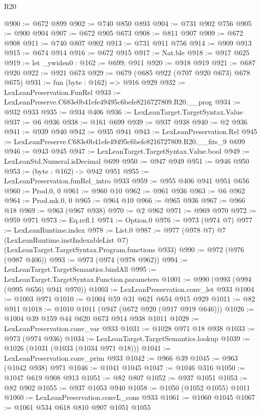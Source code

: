 \begin{lexlean}{R20}
\begin{coremodule}
@900 := @672 @899
@902 := @740 @850 @893
@904 := @731 @902 @756
@905 := @900 @904
@907 := @672 @905 @673
@908 := @811 @907
@909 := @672 @908
@911 := @740 @807 @902
@913 := @731 @911 @756
@914 := @909 @913
@915 := @674 @914
@916 := @672 @915
@917 := Nat.ble
@918 := @917 @625
@919 := let _ywiden0 : @162 := @699; @911
@920 := @918 @919
@921 := @687 @920
@922 := @921 @673
@929 := @679 (@685 @922 (@707 @920 @673) @678 @675)
@931 := fun (byte : @162) => @916 @929
@932 := LexLeanPreservation.FunRel
@933 := LexLeanPreserve.C683e0b41efe49495c6befe8216727809.R20.__prog
@934 := @932 @933
@935 := @934 @406
@936 := LexLeanTarget.TargetSyntax.Value
@937 := @6 @936
@938 := @161 @699
@939 := @937 @938
@940 := @2 @936
@941 := @939 @940
@942 := @935 @941
@943 := LexLeanPreservation.Rel
@945 := LexLeanPreserve.C683e0b41efe49495c6befe8216727809.R20.__fits_9 @699
@946 := @943 @945
@947 := LexLeanTarget.TargetSyntax.Value.bool
@949 := LexLeanStd.Numeral.isDecimal @699
@950 := @947 @949
@951 := @946 @950
@953 := (byte : @162) -> @942 @951
@955 := LexLeanPreservation.funRel_intro @933
@959 := @955 @406 @941 @951 @656
@960 := Prod.{0, 0}
@961 := @960 @10
@962 := @961 @936
@963 := @6 @962
@964 := Prod.mk.{0, 0}
@965 := @964 @10
@966 := @965 @936
@967 := @966 @18
@969 := @963 (@967 @938)
@970 := @2 @962
@971 := @969 @970
@972 := @959 @971
@973 := Eq.refl.{1}
@974 := Option.{0}
@976 := @973 (@974 @7)
@977 := LexLeanRuntime.index
@978 := List.{0}
@987 := @977
    (@978 @7)
    @7
    (LexLeanRuntime.instIndexableList @7)
    (LexLeanTarget.TargetSyntax.Program.functions @933)
@990 := @972 (@976 (@987 @406))
@993 := @973 (@974 (@978 @962))
@994 := LexLeanTarget.TargetSemantics.bindAll
@995 := LexLeanTarget.TargetSyntax.Function.parameters
@1001 := @990 (@993 (@994 (@995 @656) @941 @970))
@1003 := LexLeanPreservation.conv_let @933
@1004 := @1003 @971
@1010 := @1004 @59 @31 @621 @654 @915 @929
@1011 := @82 @911
@1018 := @1010 @1011 (@947 (@672 @920 (@917 @919 @646)))
@1026 := @1004 @39 @159 @44 @620 @673 @914 @938 @1011
@1028 := LexLeanPreservation.conv_var @933
@1031 := @1028 @971 @18 @938
@1033 := @973 (@974 @936)
@1034 := LexLeanTarget.TargetSemantics.lookup
@1039 := @1026 (@1031 (@1033 (@1034 @971 @18)))
@1041 := LexLeanPreservation.conv_prim @933
@1042 := @966 @39
@1045 := @963 (@1042 @938) @971
@1046 := @1041 @1045
@1047 := @1046 @316
@1050 := @1047 @619 @908 @913
@1051 := @82 @807
@1052 := @937 @1051
@1053 := @82 @902
@1055 := @937 @1053 @940
@1058 := @1050 (@1052 @1055) @1011
@1060 := LexLeanPreservation.convL_cons @933
@1061 := @1060 @1045
@1067 := @1061 @534 @618 @810 @907 @1051 @1055

\end{coremodule}
\end{lexlean}
